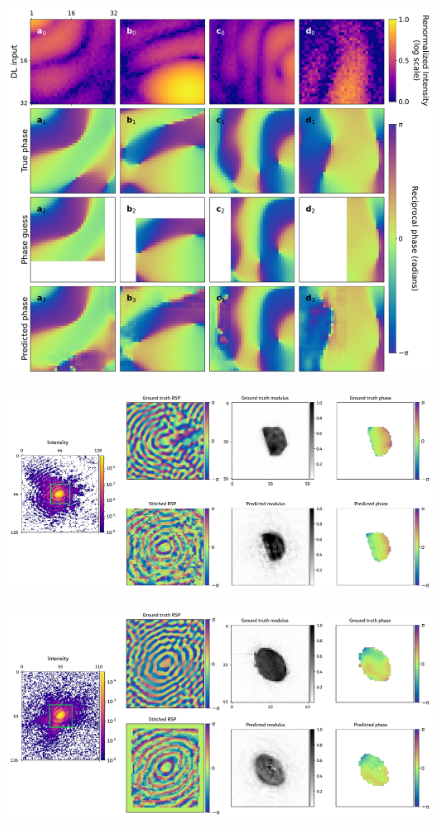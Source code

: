 \begin{figure}[H]
    \centering
    \includegraphics[width=\textwidth]{figures/Phasing/outer_patches_low_strain_RSP.pdf}
    \caption{}

    \label{fig:outerpatch_obj_lowstrain}
\end{figure}



\begin{figure}[H]
    \centering
    \includegraphics[width=\textwidth]{figures/Phasing/stitching_low_strain_sim.pdf}
    \caption{}
    \label{fig:stitching_sim_low}
\end{figure}

\begin{figure}[H]
    \centering
    \includegraphics[width=\textwidth]{figures/Phasing/stitching_low_strain_exp.pdf}
    \caption{}
    \label{fig:stitching_exp_low}
\end{figure}

